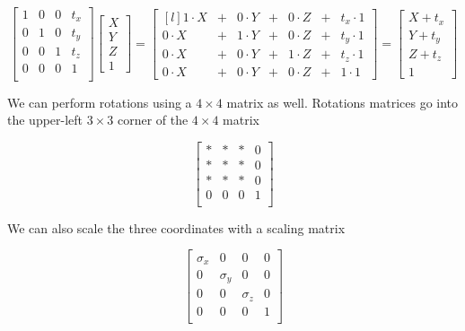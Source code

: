 \documentclass{article}
\theoremstyle{definition}
\begin{document}
\begin{equation*}
\begin{bmatrix}  1 & 0 & 0 & t_x \\ 
                          0 & 1 & 0 & t_y \\ 
                          0 & 0 & 1 & t_z \\
                          0 & 0 & 0 & 1     \\
\end{bmatrix} 
\begin{bmatrix} X \\ Y \\ Z \\ 1 \end{bmatrix} =
\begin{bmatrix*}[l]
1 \cdot X  &+& 0 \cdot Y &+& 0 \cdot Z   &+&  t_x \cdot 1 \\
0 \cdot X  &+& 1 \cdot Y  &+& 0 \cdot Z  &+&  t_y \cdot 1\\
0 \cdot X  &+& 0 \cdot Y  &+& 1 \cdot Z  &+&  t_z \cdot 1\\
0 \cdot X  &+& 0 \cdot Y  &+& 0 \cdot Z   &+& 1 \cdot 1
\end{bmatrix*} =
\begin{bmatrix} X + t_x \\ Y + t_y \\ Z + t_z \\ 1 \end{bmatrix} 
\end{equation*}

\bigskip
\noindent
We can perform rotations using a $4 \times 4$ matrix as well. Rotations matrices go into the upper-left
$3 \times 3$ corner of the $4 \times 4$ matrix

\begin{equation*}
\begin{bmatrix}  * & * & * & 0 \\ 
                          * & * & *  & 0 \\ 
                          * & * & * & 0 \\
                          0 & 0 & 0 & 1     \\
\end{bmatrix} 
\end{equation*}

\bigskip
\noindent
We can also scale the three coordinates with a scaling matrix


\begin{equation*}
\begin{bmatrix}  \sigma_x & 0 & 0 & 0 \\ 
                          0 & \sigma_y& 0 & 0 \\ 
                          0 & 0 & \sigma_z & 0 \\
                          0 & 0 & 0 & 1     \\
\end{bmatrix} 
\end{equation*}
\end{document}
